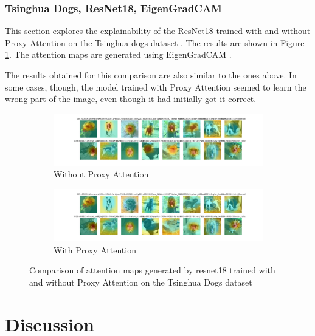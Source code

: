 \documentclass[a4paper,11pt,openright]{book}
\begin{document}
\subsection{Tsinghua Dogs, ResNet18, EigenGradCAM}
This section explores the explainability of the ResNet18 \cite{heDeepResidualLearning2016} trained with and without Proxy Attention on the Tsinghua dogs dataset \cite{zouNewDatasetDog2020}. The results are shown in Figure \ref{fig:resnet18_tsing}. The attention maps are generated using EigenGradCAM \cite{banymuhammadEigenCAMVisualExplanations2021}.

The results obtained for this comparison are also similar to the ones above. In some cases, though, the model trained with Proxy Attention seemed to learn the wrong part of the image, even though it had initially got it correct.

\begin{figure}[!htb]
    \begin{subfigure}[b]{1\textwidth}
        \includegraphics[width=\linewidth]{images/tsing_resnet18_noproxy_0.pdf}
        \caption{Without Proxy Attention}
    \end{subfigure}
    \begin{subfigure}[b]{1\textwidth}
        \includegraphics[width=\linewidth]{images/tsing_resnet18_proxy_0.pdf}
        \caption{With Proxy Attention}
    \end{subfigure}
    \caption{Comparison of attention maps generated by resnet18 trained with and without Proxy Attention on the Tsinghua Dogs dataset}
    \label{fig:resnet18_tsing}
\end{figure}

\chapter{Discussion} \label{ch:discussion}
\end{document}
